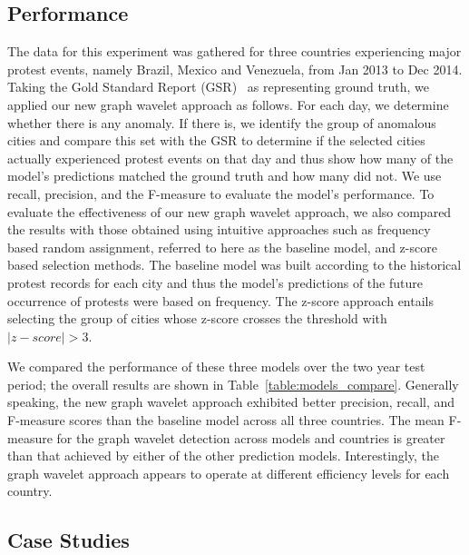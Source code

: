 \documentclass[twoside,leqno,twocolumn]{article}
\begin{document}
\subsection{Performance}
The data for this experiment was gathered for three countries experiencing major protest events, namely Brazil, Mexico and Venezuela, from Jan 2013 to Dec 2014. Taking the Gold Standard Report (GSR)~\cite{ramakrishnan2014beating} as representing ground truth, we applied our new graph wavelet approach as follows. For each day, we determine whether there is any anomaly. If there is, we
identify the group of anomalous cities and compare this set
with the GSR to determine if the selected cities actually experienced protest events on that day and thus show how many of the model's predictions matched the ground truth and how many did not. We use recall, precision, and the F-measure to evaluate the model's performance. To evaluate the effectiveness of our new graph wavelet approach, we also compared the results with those obtained using intuitive approaches such as frequency based random assignment, referred to here as the baseline model, and z-score based selection methods. The baseline model was built according to the historical protest records for each city and thus the model's predictions of the future occurrence of protests were based on frequency. The z-score approach entails
selecting the group of cities whose z-score crosses the threshold with $|z-score|>3$.


We compared the performance of these three models over the two year test period; the overall results are shown in Table~\ref{table:models_compare}. Generally speaking, the new graph wavelet approach exhibited better precision, recall, and F-measure scores than the baseline model across all three countries. The mean F-measure for the graph wavelet detection across models and countries is greater than that achieved by either of the other prediction models. Interestingly, the graph wavelet approach appears to operate at different efficiency levels for each country. %

\subsection{Case Studies}
\label{sec:highlighted_results}
\end{document}
